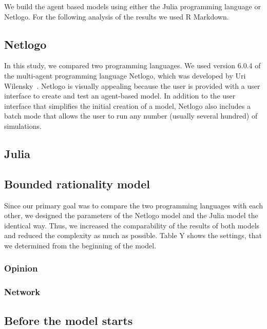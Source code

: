 \documentclass[runningheads]{llncs}
\begin{document}
We build the agent based models using either the Julia programming
language or Netlogo. For the following analysis of the results we used R
Markdown.

\hypertarget{netlogo}{%
\subsection{Netlogo}\label{netlogo}}

In this study, we compared two programming languages. We used version
6.0.4 of the multi-agent programming language Netlogo, which was
developed by Uri Wilensky~\autocite{Wilensky1999}. Netlogo is visually
appealing because the user is provided with a user interface to create
and test an agent-based model. In addition to the user interface that
simplifies the initial creation of a model, Netlogo also includes a
batch mode that allows the user to run any number (usually several
hundred) of simulations.

\hypertarget{julia}{%
\subsection{Julia}\label{julia}}

\hypertarget{bounded-rationality-model}{%
\subsection{Bounded rationality model}\label{bounded-rationality-model}}

Since our primary goal was to compare the two programming languages with
each other, we designed the parameters of the Netlogo model and the
Julia model the identical way. Thus, we increased the comparability of
the results of both models and reduced the complexity as much as
possible. Table Y shows the settings, that we determined from the
beginning of the model.

\hypertarget{opinion}{%
\subsubsection{Opinion}\label{opinion}}

\hypertarget{network}{%
\subsubsection{Network}\label{network}}

\hypertarget{before-the-model-starts}{%
\subsection{Before the model starts}\label{before-the-model-starts}}
\end{document}
